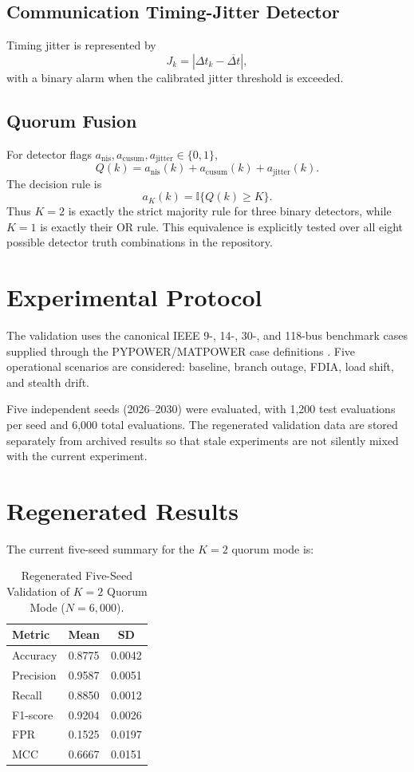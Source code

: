 \documentclass[journal]{IEEEtran}
\begin{document}
\subsection{Communication Timing-Jitter Detector}
Timing jitter is represented by
\begin{equation}
J_k=\left|\Delta t_k-\overline{\Delta t}\right|,
\end{equation}
with a binary alarm when the calibrated jitter threshold is exceeded.

\subsection{Quorum Fusion}
For detector flags $a_{\mathrm{nis}},a_{\mathrm{cusum}},a_{\mathrm{jitter}}\in\{0,1\}$,
\begin{equation}
Q(k)=a_{\mathrm{nis}}(k)+a_{\mathrm{cusum}}(k)+a_{\mathrm{jitter}}(k).
\end{equation}
The decision rule is
\begin{equation}
a_{K}(k)=\mathbb{I}\{Q(k)\ge K\}.
\end{equation}
Thus $K=2$ is exactly the strict majority rule for three binary detectors, while $K=1$ is exactly their OR rule. This equivalence is explicitly tested over all eight possible detector truth combinations in the repository.

\section{Experimental Protocol}
The validation uses the canonical IEEE 9-, 14-, 30-, and 118-bus benchmark cases supplied through the PYPOWER/MATPOWER case definitions \cite{Zimmerman2011,PYPOWER}. Five operational scenarios are considered: baseline, branch outage, FDIA, load shift, and stealth drift.

Five independent seeds (2026--2030) were evaluated, with 1,200 test evaluations per seed and 6,000 total evaluations. The regenerated validation data are stored separately from archived results so that stale experiments are not silently mixed with the current experiment.

\section{Regenerated Results}
The current five-seed summary for the $K=2$ quorum mode is:
\begin{table}[t]
\caption{Regenerated Five-Seed Validation of $K=2$ Quorum Mode ($N=6,000$).}
\label{tab:overall_performance}
\centering
\setlength{\tabcolsep}{5pt}
\begin{tabular}{lcc}
\toprule
Metric & Mean & SD \\
\midrule
Accuracy & 0.8775 & 0.0042 \\
Precision & 0.9587 & 0.0051 \\
Recall & 0.8850 & 0.0012 \\
F1-score & 0.9204 & 0.0026 \\
FPR & 0.1525 & 0.0197 \\
MCC & 0.6667 & 0.0151 \\
\bottomrule
\end{tabular}
\end{table}
\end{document}
